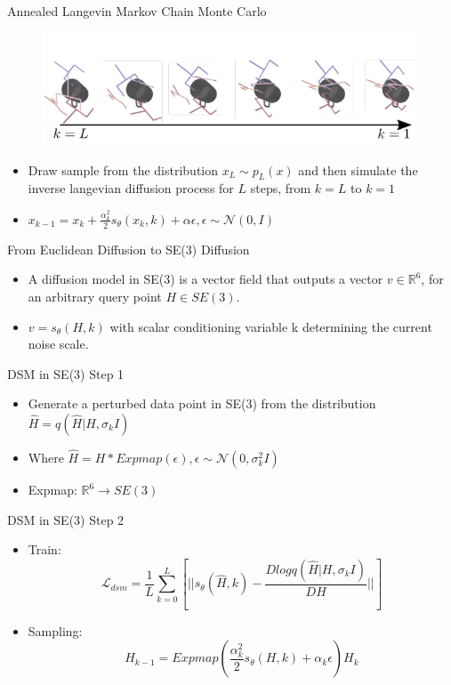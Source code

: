 \documentclass{beamer}
\begin{document}
\begin{frame}{Annealed Langevin Markov Chain Monte Carlo}
\begin{figure}
\includegraphics[width=0.8\linewidth]{grasp_diffusion.png}
\end{figure}
\begin{itemize}
    \item Draw sample from the distribution $x_L \sim p_L(x)$ and then simulate the inverse langevian diffusion process for $L$ steps, from $k=L$ to $k=1$
    \item $x_{k-1}=x_k+\frac{\alpha^2_k}{2} s_\theta(x_k, k) + \alpha \epsilon, \epsilon \sim \mathcal{N}(0,I)$
\end{itemize}
\end{frame}


\begin{frame}{From Euclidean Diffusion to SE(3) Diffusion}
\begin{itemize}
    \item A diffusion model in SE(3) is a vector field that outputs a vector $v \in \mathbb{R}^6$, for an arbitrary query point $H \in SE(3)$.
    \item $v=s_\theta (H,k)$ with scalar conditioning variable k determining the current noise scale.
\end{itemize} 
\end{frame}


\begin{frame}{DSM in SE(3) Step 1}
\begin{itemize}
    \item Generate a perturbed data point in SE(3) from the distribution $\hat{H}=q(\hat{H}|H, \sigma_k I)$
    \item Where $\hat{H}=H*Expmap(\epsilon), \epsilon \sim \mathcal{N}(0,\sigma^2_kI)$
    \item Expmap: $\mathbb{R}^6 \rightarrow SE(3)$
\end{itemize} 
\end{frame}


\begin{frame}{DSM in SE(3) Step 2}
\begin{itemize}
    \item Train: \[ \mathcal{L}_{dsm}=\frac{1}{L} \sum^L_{k=0}[|| s_\theta (\hat{H},k)-\frac{Dlogq(\hat{H}|H,\sigma_k I)}{DH} ||] \]
    \item Sampling: \[ H_{k-1}=Expmap(\frac{\alpha^2_k}{2}s_\theta(H,k)+\alpha_k\epsilon)H_k\]
\end{itemize} 
\end{frame}
\end{document}
